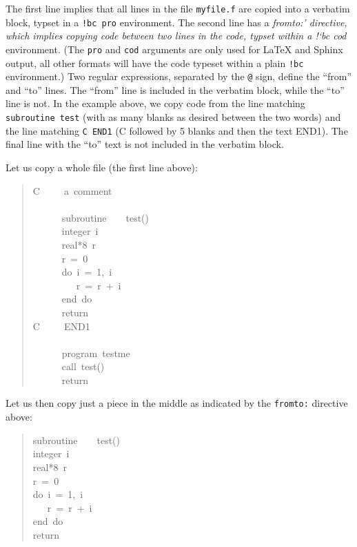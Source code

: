 \documentclass[a4paper,english]{article}
\providecommand*{\DUroletitlereference}[1]{\textsl{#1}}
\begin{document}
The first line implies that all lines in the file \texttt{myfile.f} are
copied into a verbatim block, typset in a \texttt{!bc pro} environment.  The
second line has a \DUroletitlereference{fromto:' directive, which implies copying code
between two lines in the code, typset within a !`bc cod}
environment. (The \texttt{pro} and \texttt{cod} arguments are only used for LaTeX
and Sphinx output, all other formats will have the code typeset within
a plain \texttt{!bc} environment.) Two regular expressions, separated by the
\texttt{@} sign, define the ``from'' and ``to'' lines.  The ``from'' line is
included in the verbatim block, while the ``to'' line is not. In the
example above, we copy code from the line matching \texttt{subroutine test}
(with as many blanks as desired between the two words) and the line
matching \texttt{C END1} (C followed by 5 blanks and then the text END1). The
final line with the ``to'' text is not included in the verbatim block.

Let us copy a whole file (the first line above):
%
\begin{quote}{\ttfamily \raggedright \noindent
C~~~~~a~comment\\
~\\
~~~~~~subroutine~~~~test()\\
~~~~~~integer~i\\
~~~~~~real*8~r\\
~~~~~~r~=~0\\
~~~~~~do~i~=~1,~i\\
~~~~~~~~~r~=~r~+~i\\
~~~~~~end~do\\
~~~~~~return\\
C~~~~~END1\\
~\\
~~~~~~program~testme\\
~~~~~~call~test()\\
~~~~~~return
}
\end{quote}

Let us then copy just a piece in the middle as indicated by the \texttt{fromto:}
directive above:
%
\begin{quote}{\ttfamily \raggedright \noindent
subroutine~~~~test()\\
integer~i\\
real*8~r\\
r~=~0\\
do~i~=~1,~i\\
~~~r~=~r~+~i\\
end~do\\
return
}
\end{quote}
\end{document}
